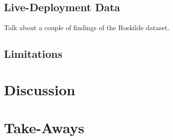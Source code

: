 \subsection{Live-Deployment Data}
Talk about a couple of findings of the Roskilde dataset. 

\subsection{Limitations}


\section{Discussion}


\section{Take-Aways}



